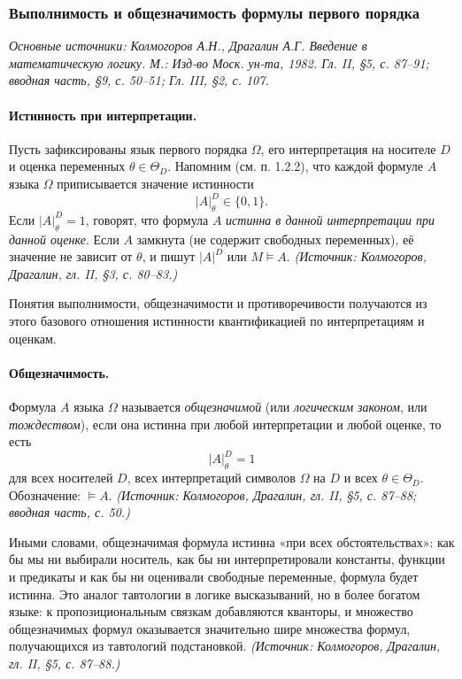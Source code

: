 \documentclass[a4paper,12pt]{article}
\begin{document}
\subsubsection{Выполнимость и общезначимость формулы первого порядка}

\noindent\textit{Основные источники: Колмогоров А.Н., Драгалин А.Г. Введение в математическую логику. М.: Изд-во Моск. ун-та, 1982. Гл. II, §5, с. 87--91; вводная часть, §9, с. 50--51; Гл. III, §2, с. 107.}

\paragraph{Истинность при интерпретации.} Пусть зафиксированы язык первого порядка \(\Omega\), его интерпретация на носителе \(D\) и оценка переменных \(\theta\in\Theta_D\). Напомним (см. п. 1.2.2), что каждой формуле \(A\) языка \(\Omega\) приписывается значение истинности
\[
|A|^D_\theta\in\{0,1\}.
\]
Если \(|A|^D_\theta=1\), говорят, что формула \(A\) \emph{истинна в данной интерпретации при данной оценке}. Если \(A\) замкнута (не содержит свободных переменных), её значение не зависит от \(\theta\), и пишут \(|A|^D\) или \(M\models A\).
\textit{(Источник: Колмогоров, Драгалин, гл. II, §3, с. 80--83.)}

Понятия выполнимости, общезначимости и противоречивости получаются из этого базового отношения истинности квантификацией по интерпретациям и оценкам.

\paragraph{Общезначимость.} Формула \(A\) языка \(\Omega\) называется \emph{общезначимой} (или \emph{логическим законом}, или \emph{тождеством}), если она истинна при любой интерпретации и любой оценке, то есть
\[
|A|^D_\theta=1
\]
для всех носителей \(D\), всех интерпретаций символов \(\Omega\) на \(D\) и всех \(\theta\in\Theta_D\). Обозначение: \(\models A\).
\textit{(Источник: Колмогоров, Драгалин, гл. II, §5, с. 87--88; вводная часть, с. 50.)}

Иными словами, общезначимая формула истинна «при всех обстоятельствах»: как бы мы ни выбирали носитель, как бы ни интерпретировали константы, функции и предикаты и как бы ни оценивали свободные переменные, формула будет истинна. Это аналог тавтологии в логике высказываний, но в более богатом языке: к пропозициональным связкам добавляются кванторы, и множество общезначимых формул оказывается значительно шире множества формул, получающихся из тавтологий подстановкой.
\textit{(Источник: Колмогоров, Драгалин, гл. II, §5, с. 87--88.)}
\end{document}
